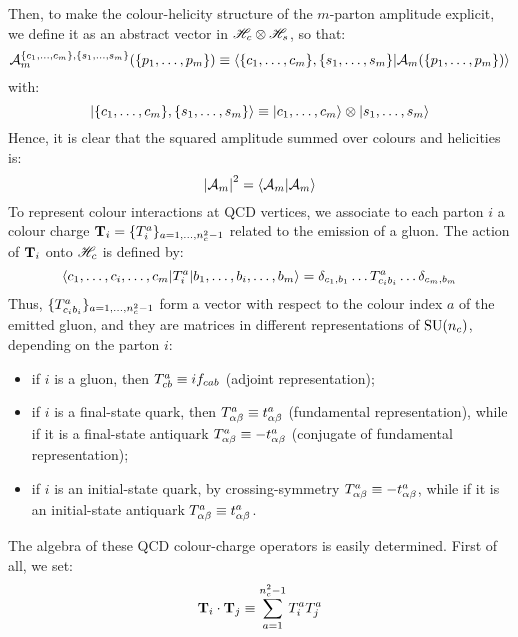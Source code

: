 Then, to make the colour-helicity structure of the $ m $-parton amplitude explicit, we define it as an abstract vector in $ \mathscr{H}_c \otimes \mathscr{H}_s $, so that:
\begin{equation}
  \mathcal{A}_m^{\{c_1, \dots, c_m\}, \{s_1, \dots, s_m\}}(\{p_1, \dots, p_m\}) \equiv \braket{\{c_1, \dots, c_m\}, \{s_1, \dots, s_m\} | \mathcal{A}_m(\{p_1, \dots, p_m\})}
\end{equation}
with:
\begin{equation*}
  \ket{\{c_1, \dots, c_m\}, \{s_1, \dots, s_m\}} \equiv \ket{c_1, \dots, c_m} \otimes \ket{s_1, \dots, s_m}
\end{equation*}
Hence, it is clear that the squared amplitude summed over colours and helicities is:
\begin{equation}
  \left\lvert\mathcal{A}_m\right\rvert^2 = \braket{\mathcal{A}_m | \mathcal{A}_m}
\end{equation}
To represent colour interactions at QCD vertices, we associate to each parton $ i $ a colour charge $ \mathbf{T}_i = \{T_i^a\}_{a = 1, \dots, n_c^2 - 1} $ related to the emission of a gluon. The action of $ \mathbf{T}_i $ onto $ \mathscr{H}_c $ is defined by:
\begin{equation}
  \braket{c_1, \dots, c_i, \dots, c_m | T_i^a | b_1, \dots, b_i, \dots, b_m} = \delta_{c_1, b_1} \dots T^a_{c_i b_i} \dots \delta_{c_m, b_m}
  \label{eq:t-act}
\end{equation}
Thus, $ \{T^a_{c_i b_i}\}_{a = 1, \dots, n_c^2 - 1} $ form a vector with respect to the colour index $ a $ of the emitted gluon, and they are matrices in different representations of $ \mathrm{SU}(n_c) $, depending on the parton $ i $:
\begin{itemize}
  \item if $ i $ is a gluon, then $ T^a_{cb} \equiv i f_{cab} $ (adjoint representation);
  \item if $ i $ is a final-state quark, then $ T^a_{\alpha \beta} \equiv t^a_{\alpha \beta} $ (fundamental representation), while if it is a final-state antiquark $ T^a_{\alpha \beta} \equiv - t^a_{\alpha \beta} $ (conjugate of fundamental representation);
  \item if $ i $ is an initial-state quark, by crossing-symmetry $ T^a_{\alpha \beta} \equiv - t^a_{\alpha \beta}$, while if it is an initial-state antiquark $ T^a_{\alpha \beta} \equiv t^a_{\alpha \beta} $.
\end{itemize}
The algebra of these QCD colour-charge operators is easily determined. First of all, we set:
\begin{equation}
  \mathbf{T}_i \cdot \mathbf{T}_j \equiv \sum_{a = 1}^{n_c^2 - 1} T_i^a T_j^a
  \label{eq:t-dot}
\end{equation}
